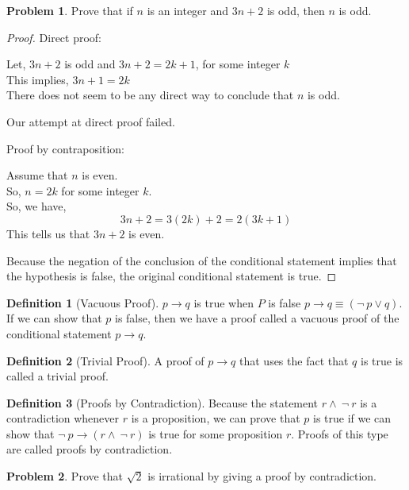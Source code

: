 \documentclass[12pt,oneside,a4paper]{book}
\theoremstyle{remark}
\theoremstyle{definition}
\newtheorem{prob}{Problem}[section]
\newtheorem{defn}{Definition}
\newcommand{\ptoq}{p \to q}
\begin{document}
\begin{prob}
    Prove that if \(n\) is an integer and \(3n+2\) is odd, then \(n\) is odd.
\end{prob}
\begin{proof}
    Direct proof:

    Let, \(3n+2\) is odd and \(3n+2=2k+1\), for some integer \(k\)\\
    This implies, \(3n+1=2k\)\\
    There does not seem to be any direct way to conclude that \(n\) is odd.

    Our attempt at direct proof failed.

    Proof by contraposition:

    Assume that \(n\) is even.\\
    So, \(n=2k\) for some integer \(k\).\\
    So, we have,
    \[3n+2=3(2k)+2=2(3k+1)\]
    This tells us that \(3n+2\) is even.

    Because the negation of the conclusion of the conditional statement implies that the hypothesis is false, the original conditional statement is true.
\end{proof}
\begin{defn}[Vacuous Proof]
    \(\ptoq\) is true when $ P $ is false \(\ptoq\equiv(\neg\ p\vee q)\).\\ If we can show that $ p $ is false, then we have a proof called a vacuous proof of the conditional statement \(\ptoq\).
\end{defn}
\begin{defn}[Trivial Proof]
    A proof of \(\ptoq\) that uses the fact that $ q $ is true is called a trivial proof.
\end{defn}
\begin{defn}[Proofs by Contradiction]
    Because the statement \(r\wedge\ \neg\ r\) is a contradiction whenever $ r $ is a proposition, we can prove that $ p $ is true if we can show that \(\neg\ p\to(r\wedge\ \neg\ r)\) is true for some proposition $ r $. Proofs of this type are called proofs by contradiction.
\end{defn}
\begin{prob}
    Prove that \(\sqrt{2}\) is irrational by giving a proof by contradiction.
\end{prob}
\end{document}
